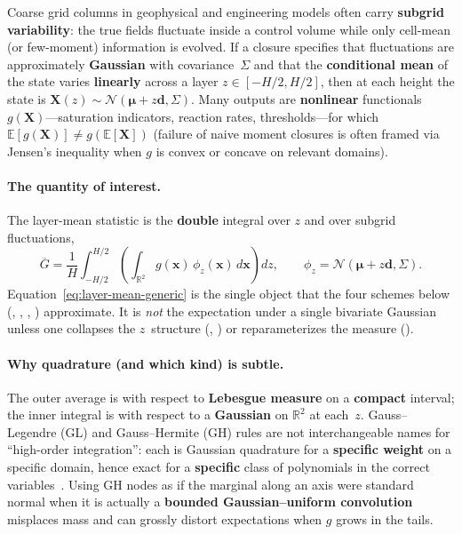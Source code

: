 \documentclass[11pt,a4paper]{article}
\begin{document}
Coarse grid columns in geophysical and engineering models often carry \textbf{subgrid variability}: the true fields fluctuate inside a control volume while only cell-mean (or few-moment) information is evolved.
If a closure specifies that fluctuations are approximately \textbf{Gaussian} with covariance~$\Sigma$ and that the \textbf{conditional mean} of the state varies \textbf{linearly} across a layer $z\in[-H/2,H/2]$, then at each height the state is $\mathbf{X}(z)\sim\mathcal{N}(\boldsymbol{\mu}+z\mathbf{d},\Sigma)$.
Many outputs are \textbf{nonlinear} functionals $g(\mathbf{X})$---saturation indicators, reaction rates, thresholds---for which $\mathbb{E}[g(\mathbf{X})]\neq g(\mathbb{E}[\mathbf{X}])$ (failure of naive moment closures is often framed via Jensen's inequality when $g$ is convex or concave on relevant domains).

\paragraph{The quantity of interest.}
The layer-mean statistic is the \textbf{double} integral over $z$ and over subgrid fluctuations,
\begin{equation}
\label{eq:layer-mean-generic}
  \overline{G}=\frac{1}{H}\int_{-H/2}^{H/2}\left(\int_{\mathbb{R}^2} g(\mathbf{x})\,\phi_{z}(\mathbf{x})\,d\mathbf{x}\right)dz,
  \qquad
  \phi_{z}=\mathcal{N}(\boldsymbol{\mu}+z\mathbf{d},\Sigma).
\end{equation}
Equation~\eqref{eq:layer-mean-generic} is the single object that the four schemes below (\centeronly, \momentmatched, \columntensor, \profileros) approximate.
It is \emph{not} the expectation under a single bivariate Gaussian unless one collapses the $z$~structure (\centeronly, \momentmatched) or reparameterizes the measure (\profileros).

\paragraph{Why quadrature (and which kind) is subtle.}
The outer average is with respect to \textbf{Lebesgue measure} on a \textbf{compact} interval; the inner integral is with respect to a \textbf{Gaussian} on $\mathbb{R}^2$ at each~$z$.
Gauss--Legendre (GL) and Gauss--Hermite (GH) rules are not interchangeable names for ``high-order integration'': each is Gaussian quadrature for a \textbf{specific weight} on a specific domain, hence exact for a \textbf{specific} class of polynomials in the correct variables~\cite{golub,gautschi}.
Using GH nodes as if the marginal along an axis were standard normal when it is actually a \textbf{bounded Gaussian--uniform convolution} misplaces mass and can grossly distort expectations when $g$ grows in the tails.
\end{document}
